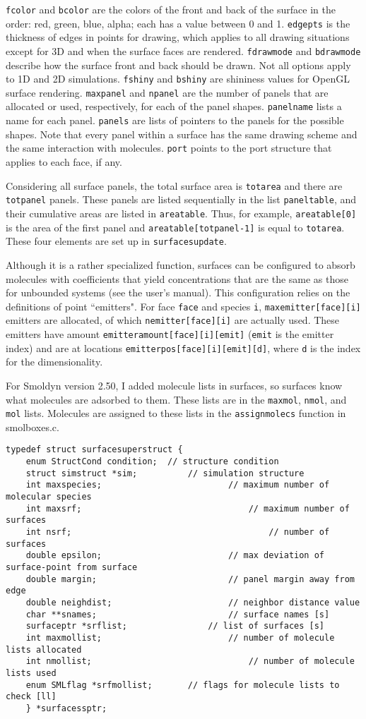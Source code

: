 \documentclass {book}
\newcommand {\ttt} {\texttt}
\begin{document}
\ttt{fcolor} and \ttt{bcolor} are the colors of the front and back of the surface in the order: red, green, blue, alpha; each has a value between 0 and 1. \ttt{edgepts} is the thickness of edges in points for drawing, which applies to all drawing situations except for 3D and when the surface faces are rendered. \ttt{fdrawmode} and \ttt{bdrawmode} describe how the surface front and back should be drawn. Not all options apply to 1D and 2D simulations. \ttt{fshiny} and \ttt{bshiny} are shininess values for OpenGL surface rendering. \ttt{maxpanel} and \ttt{npanel} are the number of panels that are allocated or used, respectively, for each of the panel shapes. \ttt{panelname} lists a name for each panel. \ttt{panels} are lists of pointers to the panels for the possible shapes. Note that every panel within a surface has the same drawing scheme and the same interaction with molecules. \ttt{port} points to the port structure that applies to each face, if any.

Considering all surface panels, the total surface area is \ttt{totarea} and there are \ttt{totpanel} panels. These panels are listed sequentially in the list \ttt{paneltable}, and their cumulative areas are listed in \ttt{areatable}. Thus, for example, \ttt{areatable[0]} is the area of the first panel and \ttt{areatable[totpanel-1]} is equal to \ttt{totarea}. These four elements are set up in \ttt{surfacesupdate}.

Although it is a rather specialized function, surfaces can be configured to absorb molecules with coefficients that yield concentrations that are the same as those for unbounded systems (see the user's manual). This configuration relies on the definitions of point ``emitters". For face \ttt{face} and species \ttt{i}, \ttt{maxemitter[face][i]} emitters are allocated, of which \ttt{nemitter[face][i]} are actually used. These emitters have amount \ttt{emitteramount[face][i][emit]} (\ttt{emit} is the emitter index) and are at locations \ttt{emitterpos[face][i][emit][d]}, where \ttt{d} is the index for the dimensionality.

For Smoldyn version 2.50, I added molecule lists in surfaces, so surfaces know what molecules are adsorbed to them. These lists are in the \ttt{maxmol}, \ttt{nmol}, and \ttt{mol} lists. Molecules are assigned to these lists in the \ttt{assignmolecs} function in smolboxes.c.

\begin{lstlisting}
typedef struct surfacesuperstruct {
	enum StructCond condition;	// structure condition
	struct simstruct *sim;			// simulation structure
	int maxspecies;							// maximum number of molecular species
	int maxsrf;									// maximum number of surfaces
	int nsrf;										// number of surfaces
	double epsilon;							// max deviation of surface-point from surface
	double margin;							// panel margin away from edge
	double neighdist;						// neighbor distance value
	char **snames;							// surface names [s]
	surfaceptr *srflist;				// list of surfaces [s]
	int maxmollist;							// number of molecule lists allocated
	int nmollist;								// number of molecule lists used
	enum SMLflag *srfmollist;		// flags for molecule lists to check [ll]
	} *surfacessptr;
\end{lstlisting}
\end{document}

